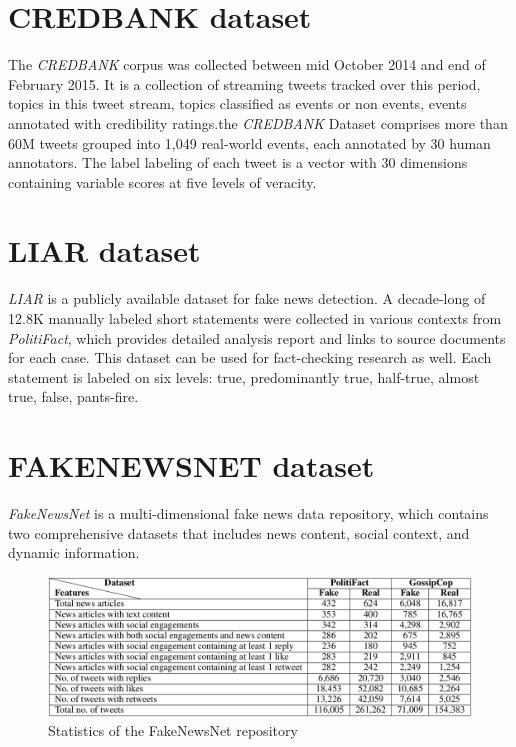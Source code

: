 \documentclass[10pt, english]{report}
\begin{document}
\section{CREDBANK dataset \cite{mitra2015credbank}}
The \textit{CREDBANK} corpus was collected between mid October 2014 and end of February 2015. It is a collection of streaming tweets tracked over this period, topics in this tweet stream, topics classified as events or non events, events annotated with credibility ratings.the \textit{CREDBANK} Dataset comprises more than 60M tweets grouped into 1,049 real-world events, each annotated by 30 human annotators. The label labeling of each tweet is a vector with 30 dimensions containing variable scores at five levels of veracity.

\section{LIAR dataset \cite{wang2017liar}}
\textit{LIAR} is a publicly available dataset for fake news detection. A decade-long of 12.8K manually labeled short statements were collected in various contexts from \textit{PolitiFact}, which provides detailed analysis report and links to source documents for each case. This dataset can be used for fact-checking research as well. Each statement is labeled on six levels: true, predominantly true, half-true, almost true, false, pants-fire.



\section{FAKENEWSNET dataset \cite{shu2018fakenewsnet}}
\textit{FakeNewsNet} is a multi-dimensional fake news data repository, which contains two comprehensive datasets that includes news content, social context, and dynamic information.

\begin{figure}[H]
	\centering
	\includegraphics[scale=0.43]{img/fake_news_net_stats.png}
	\caption{Statistics of the FakeNewsNet repository \cite{shu2018fakenewsnet}}
\end{figure}
\end{document}
